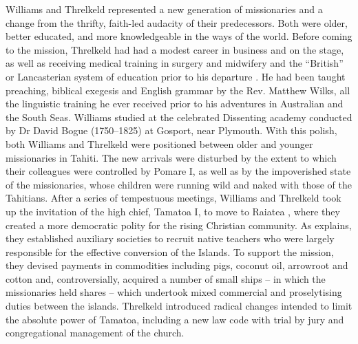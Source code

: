 Williams and Threlkeld represented a new generation of missionaries and a change from the thrifty, faith-led audacity of their predecessors. Both were older, better educated, and more knowledgeable in the ways of the world. Before coming to the mission, Threlkeld had had a modest career in business and on the stage, as well as receiving medical training in surgery and midwifery and the “British” or Lancasterian system of education prior to his departure \citep[16--17]{gunson_australian_1974a}. He had been taught preaching, biblical exegesis and English grammar by the Rev. Matthew Wilks, all the linguistic training he ever received prior to his adventures in Australian and the South Seas. Williams studied at the celebrated Dissenting academy conducted by Dr David Bogue (1750--1825) at Gosport, near Plymouth. With this polish, both Williams and Threlkeld were positioned between older and younger missionaries in Tahiti. The new arrivals were disturbed by the extent to which their colleagues were controlled by Pomare I, as well as by the impoverished state of the missionaries, whose children were running wild and naked with those of the Tahitians. After a series of tempestuous meetings, Williams and Threlkeld took up the invitation of the high chief, Tamatoa I, to move to Raiatea \citep[243]{lovett_history_1899}, where they created a more democratic polity for the rising Christian community. As \citet[26--27]{garrett_live_1982} explains, they established auxiliary societies to recruit native teachers who were largely responsible for the effective conversion of the Islands. To support the mission, they devised payments in commodities including pigs, coconut oil, arrowroot and cotton and, controversially, acquired a number of small ships -- in which the missionaries held shares -- which undertook mixed commercial and proselytising duties between the islands. Threlkeld introduced radical changes intended to limit the absolute power of Tamatoa, including a new law code \citep[112]{williams_narrative_1839} with trial by jury \citep[248]{lovett_history_1899} and congregational management of the church.

